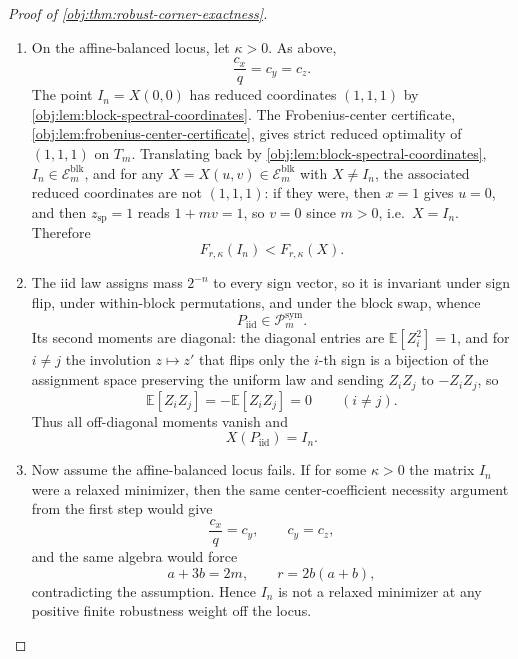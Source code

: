 \documentclass[11pt]{article}
\begin{document}
\begin{proof}[Proof of \cref{obj:thm:robust-corner-exactness}]
\begin{enumerate}
\item On the affine-balanced locus, let \(\kappa>0\).  As above,
\[
\frac{c_x}{q}=c_y=c_z .
\]
The point \(I_n=X(0,0)\) has reduced coordinates \((1,1,1)\) by
\cref{obj:lem:block-spectral-coordinates}.  The Frobenius-center certificate, \cref{obj:lem:frobenius-center-certificate}, gives strict reduced optimality of
\((1,1,1)\) on \(T_m\).  Translating back by
\cref{obj:lem:block-spectral-coordinates}, \(I_n\in\mathcal E_m^{\mathrm{blk}}\), and
for any \(X=X(u,v)\in\mathcal E_m^{\mathrm{blk}}\) with \(X\ne I_n\), the associated
reduced coordinates are not \((1,1,1)\): if they were, then \(x=1\) gives \(u=0\), and then \(z_{\mathrm{sp}}=1\) reads \(1+mv=1\), so \(v=0\) since \(m>0\), i.e.\ \(X=I_n\).  Therefore
\[
F_{r,\kappa}(I_n)<F_{r,\kappa}(X).
\] %

\item The iid law assigns mass \(2^{-n}\) to every sign vector, so it is invariant under
sign flip, under within-block permutations, and under the block swap, whence
\[
P_{\mathrm{iid}}\in\mathcal P_m^{\mathrm{sym}}.
\] %
Its second moments are diagonal: the diagonal entries are \(\mathbb E[Z_i^2]=1\), and for \(i\ne j\)
the involution \(z\mapsto z'\) that flips only the \(i\)-th sign is a bijection of the
assignment space preserving the uniform law and sending \(Z_iZ_j\) to \(-Z_iZ_j\), so
\[
\mathbb E[Z_iZ_j]=-\mathbb E[Z_iZ_j]=0
\qquad (i\ne j).
\]
Thus all off-diagonal moments vanish and
\[
X(P_{\mathrm{iid}})=I_n .
\] %

\item Now assume the affine-balanced locus fails.  If for some \(\kappa>0\) the matrix
\(I_n\) were a relaxed minimizer, then the same center-coefficient necessity argument
from the first step would give
\[
\frac{c_x}{q}=c_y,\qquad c_y=c_z,
\]
and the same algebra would force
\[
a+3b=2m,\qquad r=2b(a+b),
\]
contradicting the assumption.  Hence \(I_n\) is not a relaxed minimizer at any positive
finite robustness weight off the locus. %


\end{enumerate}
\end{proof}
\end{document}
